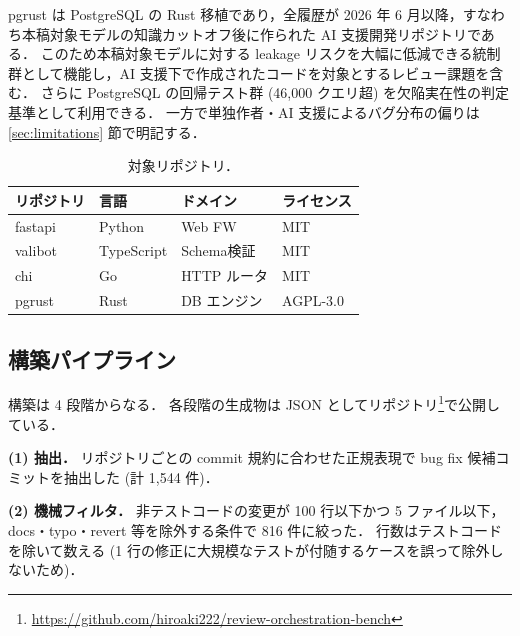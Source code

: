 \documentclass[a4j]{jarticle}
\begin{document}
pgrust は PostgreSQL の Rust 移植であり，全履歴が 2026 年 6 月以降，すなわち本稿対象モデルの知識カットオフ後に作られた AI 支援開発リポジトリである．
このため本稿対象モデルに対する leakage リスクを大幅に低減できる統制群として機能し，AI 支援下で作成されたコードを対象とするレビュー課題を含む．
さらに PostgreSQL の回帰テスト群 (46,000 クエリ超) を欠陥実在性の判定基準として利用できる．
一方で単独作者・AI 支援によるバグ分布の偏りは \ref{sec:limitations} 節で明記する．

\begin{table}[!t]
 \centering
 \caption{対象リポジトリ．}
 \label{tab:repos}
 \footnotesize
 \setlength{\tabcolsep}{4pt}
 \begin{tabular}{llll}
  \toprule
  リポジトリ & 言語 & ドメイン & ライセンス \\
  \midrule
  fastapi & Python & Web FW & MIT \\
  valibot & TypeScript & Schema検証 & MIT \\
  chi & Go & HTTP ルータ & MIT \\
  pgrust & Rust & DB エンジン & AGPL-3.0 \\
  \bottomrule
 \end{tabular}
\end{table}

\addtocounter{footnote}{1}

\subsection{構築パイプライン}

構築は 4 段階からなる．
各段階の生成物は JSON としてリポジトリ\footnote{\url{https://github.com/hiroaki222/review-orchestration-bench}}で公開している．

\textbf{(1) 抽出．}
リポジトリごとの commit 規約に合わせた正規表現で bug fix 候補コミットを抽出した (計 1,544 件)．

\textbf{(2) 機械フィルタ．}
非テストコードの変更が 100 行以下かつ 5 ファイル以下，docs・typo・revert 等を除外する条件で 816 件に絞った．
行数はテストコードを除いて数える (1 行の修正に大規模なテストが付随するケースを誤って除外しないため)．
\end{document}
